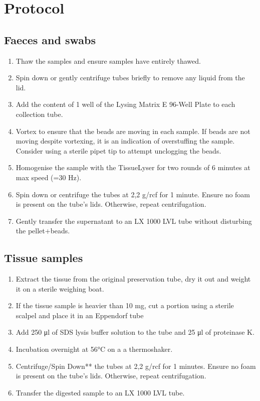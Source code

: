 \documentclass[
]{book}
\providecommand{\tightlist}{%
  \setlength{\itemsep}{0pt}\setlength{\parskip}{0pt}}
\begin{document}
\hypertarget{protocol}{%
\section{Protocol}\label{protocol}}

\hypertarget{faeces-and-swabs}{%
\subsection*{Faeces and swabs}\label{faeces-and-swabs}}

\begin{enumerate}
\def\labelenumi{\arabic{enumi}.}
\tightlist
\item
  Thaw the samples and ensure samples have entirely thawed.
\item
  Spin down or gently centrifuge tubes briefly to remove any liquid from the lid.
\item
  Add the content of 1 well of the Lysing Matrix E 96-Well Plate to each collection tube.
\item
  Vortex to ensure that the beads are moving in each sample. If beads are not moving despite vortexing, it is an indication of overstuffing the sample. Consider using a sterile pipet tip to attempt unclogging the beads.
\item
  Homogenise the sample with the TissueLyser for two rounds of 6 minutes at max speed (=30 Hz).
\item
  Spin down or centrifuge the tubes at 2,2 g/rcf for 1 minute. Ensure no foam is present on the tube's lids. Otherwise, repeat centrifugation.
\item
  Gently transfer the supernatant to an LX 1000 LVL tube without disturbing the pellet+beads.
\end{enumerate}

\hypertarget{tissue-samples}{%
\subsection*{Tissue samples}\label{tissue-samples}}

\begin{enumerate}
\def\labelenumi{\arabic{enumi}.}
\tightlist
\item
  Extract the tissue from the original preservation tube, dry it out and weight it on a sterile weighing boat.
\item
  If the tissue sample is heavier than 10 mg, cut a portion using a sterile scalpel and place it in an Eppendorf tube
\item
  Add 250 μl of SDS lysis buffer solution to the tube and 25 μl of proteinase K.
\item
  Incubation overnight at 56°C on a a thermoshaker.
\item
  Centrifuge/Spin Down** the tubes at 2,2 g/rcf for 1 minutes. Ensure no foam is present on the tube's lids. Otherwise, repeat centrifugation.
\item
  Transfer the digested sample to an LX 1000 LVL tube.
\end{enumerate}
\end{document}
